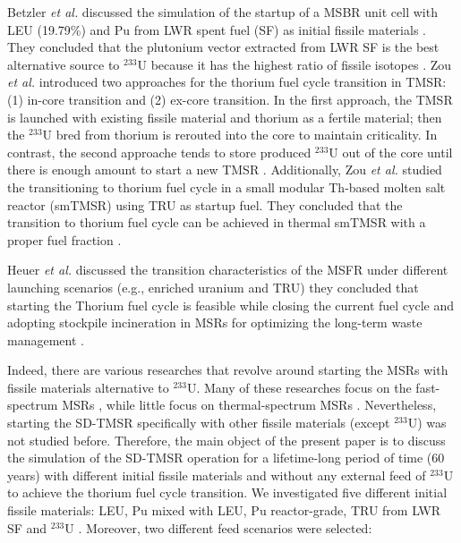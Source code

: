 Betzler \emph{et al.} discussed the simulation of the startup of a MSBR unit
cell with \gls{LEU} (19.79\%) and Pu from \gls{LWR} spent fuel (SF) as initial
fissile materials \cite{betzler2016modeling}. They concluded that the 
plutonium vector extracted from LWR SF is the best alternative source to 
$^{233}$U because it has the highest ratio of fissile isotopes
\cite{betzler2016modeling}. Zou \emph{et al.} introduced two approaches for
the thorium fuel cycle transition in \gls{TMSR}: (1) in-core transition and 
(2) ex-core transition. In the first approach, the TMSR is launched with 
existing fissile material and thorium as a fertile material; then the 
$^{233}$U bred from thorium is rerouted into the core to maintain criticality. 
In contrast, the second approache tends to store produced $^{233}$U out of the 
core until there is enough amount to start a new TMSR \cite{zou2018transition}.
Additionally, Zou \emph{et al.} studied the transitioning to thorium fuel
cycle in a small modular Th-based molten salt reactor (smTMSR) using \gls{TRU}
as startup fuel. They concluded that the transition to thorium fuel cycle can
be achieved in thermal smTMSR with a proper fuel fraction 
\cite{zou2018preliminary}.

Heuer \emph{et al.} discussed the transition characteristics of the \gls{MSFR}
under different launching scenarios (e.g., enriched uranium and TRU) they concluded that starting the Thorium fuel cycle is feasible while closing the current fuel cycle and adopting stockpile incineration in MSRs for optimizing the long-term waste management \cite{heuer2014towards}.

Indeed, there are various researches that revolve around starting the
\glspl{MSR} with fissile materials alternative to $^{233}$U. Many of these
researches focus on the fast-spectrum \glspl{MSR} \cite{ashraf2019modeling,
	ashraf2018nuclear, rykhlevskii_fuel_2019, betzler_impacts_2019,
	heuer2014towards,fiorina2013investigation}, while little focus on
thermal-spectrum \glspl{MSR} \cite{betzler2016modeling, zou2018preliminary,
	zou2018transition}. Nevertheless, starting the \gls{SD-TMSR} specifically with other
fissile materials (except $^{233}$U) was not studied before. Therefore,
the main object of the present paper is to discuss the simulation of the
\gls{SD-TMSR} operation for a lifetime-long period of time (60 years) with
different initial fissile materials and without any external feed of $^{233}$U
to achieve the thorium fuel cycle transition. We investigated five different
initial fissile materials: \gls{LEU}, Pu mixed with \gls{LEU}, Pu reactor-grade, \gls{TRU} from LWR SF and $^{233}$U \cite{de2000scenarios}. Moreover, two different feed scenarios were selected:

